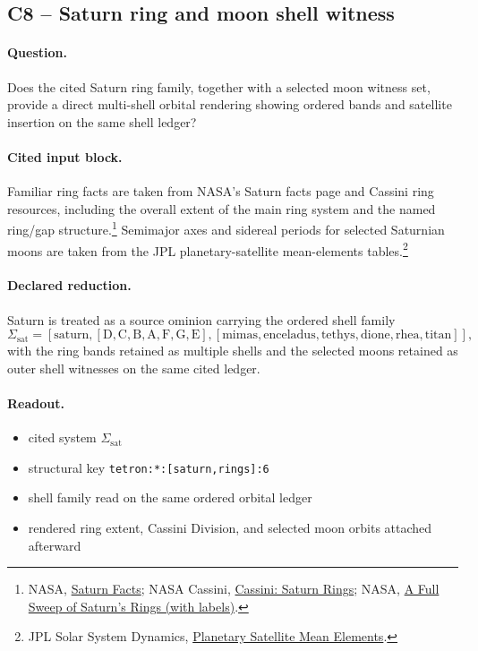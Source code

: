 \subsection{C8 -- Saturn ring and moon shell witness}\label{suppc:c8-saturn-shell-witness}
\paragraph{Question.} Does the cited Saturn ring family, together with a selected moon witness set, provide a direct multi-shell orbital rendering showing ordered bands and satellite insertion on the same shell ledger?

\paragraph{Cited input block.} Familiar ring facts are taken from NASA's Saturn facts page and Cassini ring resources, including the overall extent of the main ring system and the named ring/gap structure.\footnote{NASA, \href{https://science.nasa.gov/saturn/facts/}{Saturn Facts}; NASA Cassini, \href{https://science.nasa.gov/mission/cassini/science/rings/}{Cassini: Saturn Rings}; NASA, \href{https://science.nasa.gov/resource/a-full-sweep-of-saturns-rings-with-labels/}{A Full Sweep of Saturn's Rings (with labels)}.} Semimajor axes and sidereal periods for selected Saturnian moons are taken from the JPL planetary-satellite mean-elements tables.\footnote{JPL Solar System Dynamics, \href{https://ssd.jpl.nasa.gov/sats/elem/}{Planetary Satellite Mean Elements}.}

\paragraph{Declared reduction.} Saturn is treated as a source ominion carrying the ordered shell family
\[
\Sigma_{\mathrm{sat}} = [\mathrm{saturn},[\mathrm{D},\mathrm{C},\mathrm{B},\mathrm{A},\mathrm{F},\mathrm{G},\mathrm{E}],[\mathrm{mimas},\mathrm{enceladus},\mathrm{tethys},\mathrm{dione},\mathrm{rhea},\mathrm{titan}]],
\]
with the ring bands retained as multiple shells and the selected moons retained as outer shell witnesses on the same cited ledger.

\paragraph{Readout.}
\begin{itemize}
\item cited system $\Sigma_{\mathrm{sat}}$
\item structural key \texttt{tetron:*:[saturn,rings]:6}
\item shell family read on the same ordered orbital ledger
\item rendered ring extent, Cassini Division, and selected moon orbits attached afterward
\end{itemize}

